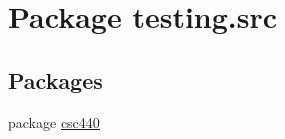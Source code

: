 \hypertarget{namespacetesting_1_1src}{\section{Package testing.\-src}
\label{namespacetesting_1_1src}
}
\subsection*{Packages}
\begin{DoxyCompactItemize}
\item 
package \hyperlink{namespacetesting_1_1src_1_1csc440}{csc440}
\end{DoxyCompactItemize}
